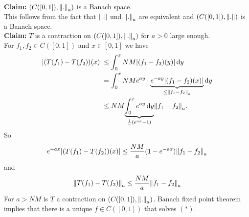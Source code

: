 \begin{beispiel}
	\textbf{Claim:} \text{    }     $(C([0,1]), \norm{.}_a)$ is a Banach space. \\
	This follows from the fact that $\norm{.}$ und $\norm{.}_a$ are equivalent and $(C([0,1]),\norm{.})$ is a Banach space. \\
	\textbf{Claim:} \text{    }     $T$ is a contraction on $(C([0,1]),\norm{.}_a)$ for $a >0$ large enough. \\
	For $f_1,f_2 \in C([0,1])$ and $x \in [0,1]$ we have
	\begin{align*}
		\abs{(T(f_1)-T(f_2))(x)} &\leq \int_{0}^{x} NM \abs{(f_1-f_2)(y)} \,\mathrm{d}y \\
		&= \int_{0}^{x}NM e^{ay} \cdot \underset{\leq \norm{f_1-f_2}_a}{\underbrace{e^{-ay} \abs{(f_1-f_2)(x)}}} \,\mathrm{d}y \\
		&\leq NM \underset{\frac{1}{a}(e^{ax}-1)}{\underbrace{\int_{0}^{x} e^{ay} \,\mathrm{d}y}} \norm{f_1-f_2}_a.
	\end{align*}
	So
	\[
		e^{-ax} \abs{(T(f_1)-T(f_2))(x)} \leq \frac{NM}{a}(1-e^{-ax})\norm{f_1-f_2}_a
	\]
	and
	\[
		\norm{T(f_1)-T(f_2)}_a \leq  \frac{NM}{a} \norm{f_1-f_2}_a
	\]
	For $a > NM$ is $T$ a contraction on $(C([0,1]),\norm{.}_a)$. Banach fixed point theorem implies that there is a unique $f \in C([0,1])$ that solves $(*)$.
\end{beispiel}
